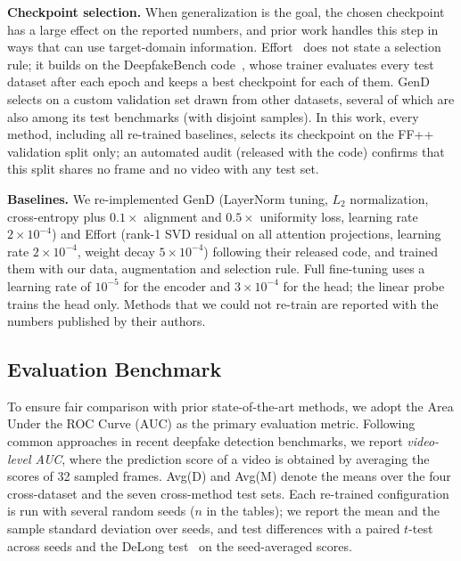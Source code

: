 \documentclass[fonts]{icst}
\newif\ifrevmark\revmarkfalse
\newcommand{\rev}[1]{\ifrevmark{\color{revblue}#1}\else#1\fi}
\newenvironment{revblock}{\ifrevmark\color{revblue}\fi}{}
\begin{document}
\begin{revblock}
\noindent\textbf{Checkpoint selection.}\label{sec:selection}
When generalization is the goal, the chosen checkpoint has a large effect on the reported numbers, and prior work handles this step in ways that can use target-domain information. Effort~\cite{yan2025effort} does not state a selection rule; it builds on the DeepfakeBench code~\cite{yan2023deepfakebench}, whose trainer evaluates every test dataset after each epoch and keeps a best checkpoint for each of them. GenD~\cite{yermakov2025gend} selects on a custom validation set drawn from other datasets, several of which are also among its test benchmarks (with disjoint samples). In this work, every method, including all re-trained baselines, selects its checkpoint on the FF++ validation split only; an automated audit (released with the code) confirms that this split shares no frame and no video with any test set.

\noindent\textbf{Baselines.}
We re-implemented GenD (LayerNorm tuning, $L_2$ normalization, cross-entropy plus $0.1\times$ alignment and $0.5\times$ uniformity loss, learning rate $2\times10^{-4}$) and Effort (rank-1 SVD residual on all attention projections, learning rate $2\times10^{-4}$, weight decay $5\times10^{-4}$) following their released code, and trained them with our data, augmentation and selection rule. Full fine-tuning uses a learning rate of $10^{-5}$ for the encoder and $3\times10^{-4}$ for the head; the linear probe trains the head only. Methods that we could not re-train are reported with the numbers published by their authors.
\end{revblock}

\subsection{Evaluation Benchmark}

To ensure fair comparison with prior state-of-the-art methods, we adopt the Area Under the ROC Curve (AUC) as the primary evaluation metric.
Following common \rev{approaches} in recent deepfake detection benchmarks, we report \textit{video-level AUC}, where the prediction score of a video is obtained by averaging the scores of 32 sampled frames.
\rev{Avg(D) and Avg(M) denote the means over the four cross-dataset and the seven cross-method test sets. Each re-trained configuration is run with several random seeds ($n$ in the tables); we report the mean and the sample standard deviation over seeds, and test differences with a paired $t$-test across seeds and the DeLong test~\cite{delong1988} on the seed-averaged scores.}
\end{document}
